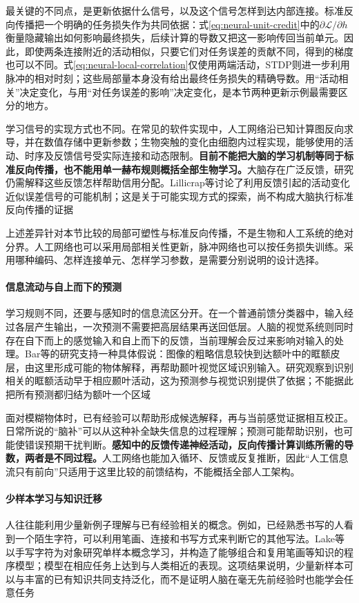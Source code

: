 最关键的不同点，是更新依据什么信号，以及这个信号怎样到达内部连接。标准反向传播把一个明确的任务损失作为共同依据：式\eqref{eq:neural-unit-credit}中的$\partial\mathcal{L}/\partial h$衡量隐藏输出如何影响最终损失，后续计算的导数又把这一影响传回当前单元。因此，即使两条连接附近的活动相似，只要它们对任务误差的贡献不同，得到的梯度也可以不同。式\eqref{eq:neural-local-correlation}仅使用两端活动，STDP则进一步利用脉冲的相对时刻；这些局部量本身没有给出最终任务损失的精确导数。用“活动相关”决定变化，与用“对任务误差的影响”决定变化，是本节两种更新示例最需要区分的地方。

学习信号的实现方式也不同。在常见的软件实现中，人工网络沿已知计算图反向求导，并在数值存储中更新参数；生物突触的变化由细胞内过程实现，能够使用的活动、时序及反馈信号受实际连接和动态限制。\textbf{目前不能把大脑的学习机制等同于标准反向传播，也不能用单一赫布规则概括全部生物学习。}大脑存在广泛反馈，研究仍需解释这些反馈怎样帮助信用分配。Lillicrap等讨论了利用反馈引起的活动变化近似误差信号的可能机制；这是关于可能实现方式的探索，尚不构成大脑执行标准反向传播的证据

上述差异针对本节比较的局部可塑性与标准反向传播，不是生物和人工系统的绝对分界。人工网络也可以采用局部相关性更新，脉冲网络也可以按任务损失训练。采用哪种编码、怎样连接单元、怎样学习参数，是需要分别说明的设计选择。

\paragraph{信息流动与自上而下的预测}
学习规则不同，还要与感知时的信息流区分开。在一个普通前馈分类器中，输入经过各层产生输出，一次预测不需要把高层结果再送回低层。人脑的视觉系统则同时存在自下而上的感觉输入和自上而下的反馈，当前理解会反过来影响对输入的处理。Bar等的研究支持一种具体假说：图像的粗略信息较快到达额叶中的眶额皮层，由这里形成可能的物体解释，再帮助颞叶视觉区域识别输入。研究观察到识别相关的眶额活动早于相应颞叶活动，这为预测参与视觉识别提供了依据；不能据此把所有预测都归结为额叶一个区域

面对模糊物体时，已有经验可以帮助形成候选解释，再与当前感觉证据相互校正。日常所说的“脑补”可以从这种补全缺失信息的过程理解；预测可能帮助识别，也可能使错误预期干扰判断。\textbf{感知中的反馈传递神经活动，反向传播计算训练所需的导数，两者是不同过程。}人工网络也能加入循环、反馈或反复推断，因此“人工信息流只有前向”只适用于这里比较的前馈结构，不能概括全部人工架构。

\paragraph{少样本学习与知识迁移}
人往往能利用少量新例子理解与已有经验相关的概念。例如，已经熟悉书写的人看到一个陌生字符，可以利用笔画、连接和书写方式来判断它的其他写法。Lake等以手写字符为对象研究单样本概念学习，并构造了能够组合和复用笔画等知识的程序模型；模型在相应任务上达到与人类相近的表现。这项结果说明，少量新样本可以与丰富的已有知识共同支持泛化，而不是证明人脑在毫无先前经验时也能学会任意任务

